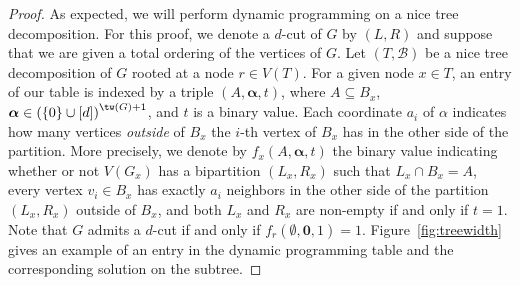 \documentclass[a4paper,UKenglish,cleveref, autoref]{lipics-v2019}
\newcommand{\ig}[1]{\textcolor{red}{[Ig: #1]}}
\newcommand{\balpha}{\boldsymbol{\alpha}}
\begin{document}
\begin{proof}
    As expected, we will perform dynamic programming on a nice tree decomposition.
    For this proof, we denote a $d$-cut of $G$ by $(L, R)$ and suppose that we are given a total ordering of the vertices of $G$.
    Let $(T, \mathcal{B})$ be a nice tree decomposition of $G$ rooted at a node $r \in V(T)$.
    For a given node $x \in T$, an entry of our table is indexed by a triple $(A, \balpha, t)$, where $A \subseteq B_x$, $\balpha \in \left(\{0\} \cup [d]\right)^{\tw(G)+1}$, and $t$ is a binary value. Each coordinate $a_i$ of $\alpha$ indicates how many vertices {\sl outside} of $B_x$ the $i$-th vertex of $B_x$ has in the other side of the partition. More precisely, we denote by $f_x(A, \balpha, t)$ the binary value indicating whether or not $V(G_x)$ has a bipartition $(L_x,R_x)$ such that $L_x \cap B_x = A$, every vertex $v_i \in B_x$ has exactly $a_i$ neighbors in the other side of the partition $(L_x,R_x)$  outside of $B_x$, and both $L_x$ and $R_x$ are non-empty if and only if $t = 1$. Note that $G$ admits a $d$-cut if and only if $f_r(\emptyset, \boldsymbol{0}, 1)=1$.
    Figure~\ref{fig:treewidth} gives an example of an entry in the dynamic programming table and the corresponding solution on the subtree.





\end{proof}
\end{document}
